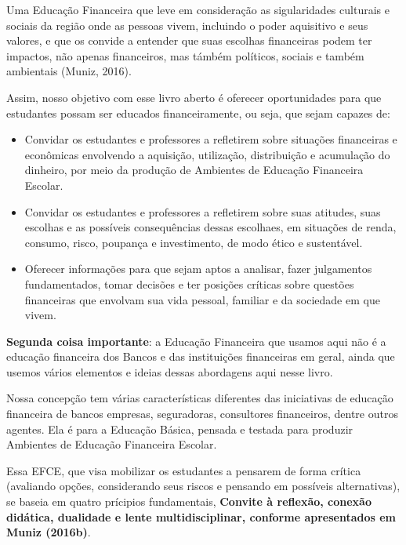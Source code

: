 \begin{paginatexto}
Uma Educação Financeira que leve em consideração as sigularidades culturais e sociais da região onde as pessoas vivem, incluindo o poder aquisitivo e seus valores, e que os convide a entender que suas escolhas financeiras podem ter impactos, não apenas financeiros, mas támbém políticos, sociais e também ambientais (Muniz, 2016).

Assim, nosso objetivo com esse livro aberto é oferecer oportunidades para que estudantes possam ser educados financeiramente, ou seja, que sejam capazes de:

\begin{itemize}
  \item Convidar os estudantes e professores a refletirem sobre situações financeiras e econômicas envolvendo a aquisição, utilização, distribuição e acumulação do dinheiro, por meio da produção de Ambientes de Educação Financeira Escolar.

  \item Convidar os estudantes e professores a refletirem sobre suas atitudes, suas escolhas e as possíveis consequências dessas escolhaes, em situações de renda, consumo, risco, poupança e investimento, de modo ético e sustentável.

  \item Oferecer informações para que sejam aptos a analisar, fazer julgamentos fundamentados, tomar decisões e ter posições críticas sobre questões financeiras que envolvam sua vida pessoal, familiar e da sociedade em que vivem.
\end{itemize}

\textbf{Segunda coisa importante}: a Educação Financeira que usamos aqui não é a educação financeira dos Bancos e das instituições financeiras em geral, ainda que usemos vários elementos e ideias dessas abordagens aqui nesse livro.

Nossa concepção tem várias características diferentes das iniciativas de educação financeira de bancos empresas, seguradoras, consultores financeiros, dentre outros agentes. Ela é para a Educação Básica, pensada e testada para produzir Ambientes de Educação Financeira Escolar.

Essa EFCE, que visa mobilizar os estudantes a pensarem de forma crítica (avaliando opções, considerando seus riscos e pensando em possíveis alternativas), se baseia em quatro prícipios fundamentais, \textbf{Convite à reflexão, conexão didática, dualidade e lente multidisciplinar, conforme apresentados em Muniz (2016b)}.


\end{paginatexto}
